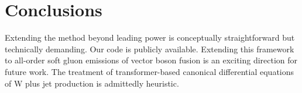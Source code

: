 \section{Conclusions}\label{sec:conclusions}

Extending the method beyond leading power is conceptually
straightforward but technically demanding. Our code is publicly
available. Extending this framework to all-order soft gluon emissions of
vector boson fusion is an exciting direction for future work. The
treatment of transformer-based canonical differential equations of W
plus jet production is admittedly heuristic.

